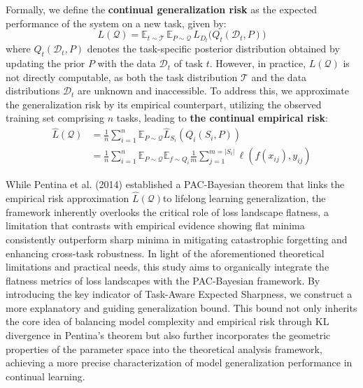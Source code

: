 \documentclass[letterpaper]{article} %
\begin{document}
Formally, we define the \textbf{continual generalization risk} as the expected performance of the system on a new task, given by:
\begin{equation}
    L(\mathcal{Q}) = \mathbb{E}_{t \sim \mathcal{T}}\, \mathbb{E}_{P \sim \mathcal{Q}}\,L_{D_t}\big(Q_t(\mathcal{D}_t, P)\big) 
\end{equation}
where $Q_t(\mathcal{D}_t, P)$ denotes the task-specific posterior distribution obtained by updating the prior $P$ with the data $\mathcal{D}_t$ of task $t$.
However, in practice, $L(\mathcal{Q})$ is not directly computable, as both the task distribution $\mathcal{T}$ and the data distributions $\mathcal{D}_t$ are unknown and inaccessible. To address this, we approximate the generalization risk by its empirical counterpart, utilizing the observed training set comprising $n$ tasks, leading to \textbf{the continual empirical risk}:
\begin{equation}
\begin{aligned}
    \hat{L}(\mathcal{Q}) 
        &= \frac{1}{n} \sum_{i=1}^n \mathbb{E}_{P \sim \mathcal{Q}}\hat{L}_{S_i}(Q_i(S_i,P))  \\
        &=\frac{1}{n}\sum_{i=1}^n\mathbb{E}_{P \sim \mathcal{Q}}\mathbb{E}_{f\sim Q_i}\frac{1}{m}\sum_{j=1}^{m=|S_i|}\ell(f(x_{ij}),y_{ij})
\end{aligned}
\end{equation}

While Pentina et al. (2014) established a PAC-Bayesian theorem that links the empirical risk approximation $\hat{L}(\mathcal{Q})$to lifelong learning generalization, the framework inherently overlooks the critical role of loss landscape flatness, a limitation that contrasts with empirical evidence showing flat minima consistently outperform sharp minima in mitigating catastrophic forgetting and enhancing cross-task robustness. In light of the aforementioned theoretical limitations and practical needs, this study aims to organically integrate the flatness metrics of loss landscapes with the PAC-Bayesian framework. By introducing the key indicator of Task-Aware Expected Sharpness, we construct a more explanatory and guiding generalization bound. This bound not only inherits the core idea of balancing model complexity and empirical risk through KL divergence in Pentina's theorem but also further incorporates the geometric properties of the parameter space into the theoretical analysis framework, achieving a more precise characterization of model generalization performance in continual learning.
\end{document}
